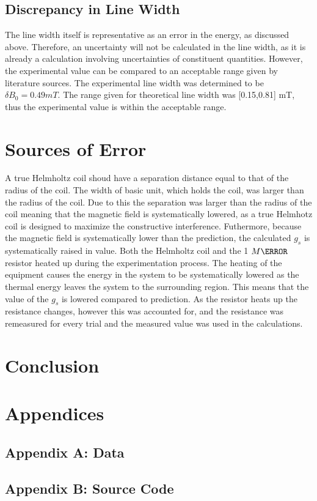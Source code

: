 \documentclass[a4paper]{article}
\begin{document}
\subsection{Discrepancy in Line Width}
\qq The line width itself is representative as an error in the energy, as discussed above. Therefore, an uncertainty will not be calculated in the line width, as it is already a calculation involving uncertainties of constituent quantities. However, the experimental value can be compared to an acceptable range given by literature sources. The experimental line width was determined to be $\delta B_0 = 0.49 mT$. The range given for theoretical line width was [0.15,0.81] mT, thus the experimental value is within the acceptable range.

\section{Sources of Error}
\qq A true Helmholtz coil shoud have a separation distance equal to
that of the radius of the coil. The width of basic unit, which holds
the coil, was larger than the radius of the coil. Due to this the
separation was larger than the radius of the coil meaning that the
magnetic field is systematically lowered, as a true Helmhotz coil is
designed to maximize the constructive interference.  Futhermore,
because the magnetic field is systematically lower than the
prediction, the calculated $g_s$ is systematically raised in
value. Both the Helmholtz coil and the 1 $M \ohm$ resistor heated up
during the experimentation process. The heating of the equipment
causes the energy in the system to be systematically lowered as the
thermal energy leaves the system to the surrounding region. This means
that the value of the $g_s$ is lowered compared to prediction. As the
resistor heats up the resistance changes, however this was accounted
for, and the resistance was remeasured for every trial and the
measured value was used in the calculations.

\section{Conclusion}
\qq

\section{Appendices}

\subsection{Appendix A: Data}

\subsection{Appendix B: Source Code}
\end{document}

